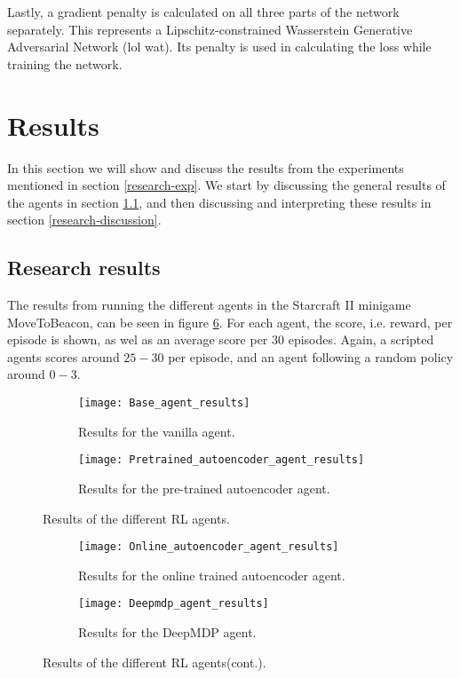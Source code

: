 Lastly, a gradient penalty is calculated on all three parts of the network separately. This represents a Lipschitz-constrained Wasserstein Generative Adversarial Network (lol wat). Its penalty is used in calculating the loss while training the network. 


\section{Results}\label{research-results}
In this section we will show and discuss the results from the experiments mentioned in section \ref{research-exp}. We start by discussing the general results of the agents in section \ref{research-general-results}, and then discussing and interpreting these results in section \ref{research-discussion}.

\subsection{Research results}\label{research-general-results}
The results from running the different agents in the Starcraft II minigame MoveToBeacon, can be seen in figure \ref{fig:results-agents}. For each agent, the score, i.e. reward, per episode is shown, as wel as an average score per $30$ episodes. Again, a scripted agents scores around $25-30$ per episode, and an agent following a random policy around $0-3$.


\begin{figure}[h]
	\centering
	\begin{subfigure}[b]{1\textwidth}
		\texttt{[image: Base\_agent\_results]}
		\caption{Results for the vanilla agent.}
		\label{fig:results-base} 
	\end{subfigure}
	\begin{subfigure}[b]{1\textwidth}
		\texttt{[image: Pretrained\_autoencoder\_agent\_results]}
		\caption{Results for the pre-trained autoencoder agent.}
		\label{fig:results-ae}
	\end{subfigure}
	\caption{Results of the different RL agents.}
\end{figure}%
\begin{figure}[ht]\ContinuedFloat
	\begin{subfigure}[b]{1\textwidth}
		\texttt{[image: Online\_autoencoder\_agent\_results]}
		\caption{Results for the online trained autoencoder agent.}
		\label{fig:results-online-ae}
	\end{subfigure}
	\begin{subfigure}[b]{\textwidth}
		\texttt{[image: Deepmdp\_agent\_results]}
		\caption{Results for the DeepMDP agent.}
		\label{fig:results-deepmdp}
	\end{subfigure}
	\caption{Results of the different RL agents(cont.).}
	\label{fig:results-agents}
\end{figure}

